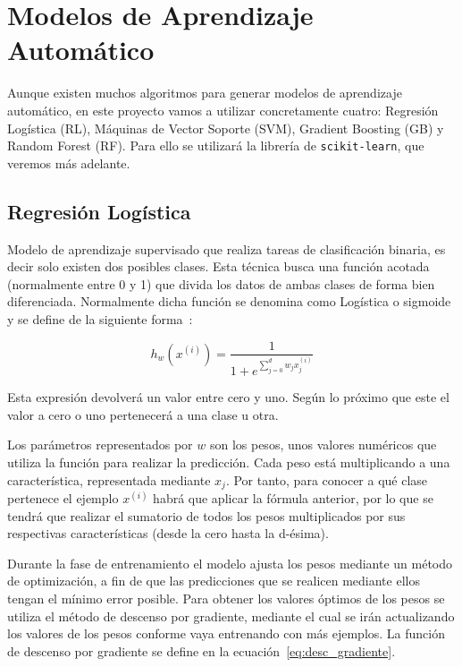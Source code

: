 \documentclass[a4paper, 12pt]{book}
\begin{document}
\section{Modelos de Aprendizaje Automático}
\label{sec:modelos_aautomatico}

Aunque existen muchos algoritmos para generar modelos de aprendizaje automático, en este proyecto vamos a utilizar concretamente cuatro: Regresión Logística (RL), Máquinas de Vector Soporte (SVM), Gradient Boosting (GB) y Random Forest (RF). Para ello se utilizará la librería de \texttt{scikit-learn}, que veremos más adelante.

\subsection{Regresión Logística}
\label{subsec:regresion_logistica}

Modelo de aprendizaje supervisado que realiza tareas de clasificación binaria, es decir solo existen dos posibles clases. Esta técnica busca una función acotada (normalmente entre 0 y 1) que divida los datos de ambas clases de forma bien diferenciada. Normalmente dicha función se denomina como Logística o sigmoide y se define de la siguiente forma~\cite{Watt2020}:

\begin{equation}
    h_w(x^{(i)}) = \frac{1}{1 + e^{\sum_{j=0}^{d} w_j x_j^{(i)} }}
\end{equation}

Esta expresión devolverá un valor entre cero y uno. Según lo próximo que este el valor a cero o uno pertenecerá a una clase u otra. 

Los parámetros representados por $w$ son los pesos, unos valores numéricos que utiliza la función para realizar la predicción. Cada peso está multiplicando a una característica, representada mediante $x_j$. Por tanto, para conocer a qué clase pertenece el ejemplo $x^{(i)}$ habrá que aplicar la fórmula anterior, por lo que se tendrá que realizar el sumatorio de todos los pesos multiplicados por sus respectivas características (desde la cero hasta la d-ésima). 

Durante la fase de entrenamiento el modelo ajusta los pesos mediante un método de optimización, a fin de que las predicciones que se realicen mediante ellos tengan el mínimo error posible. Para obtener los valores óptimos de los pesos se utiliza el método de descenso por gradiente, mediante el cual se irán actualizando los valores de los pesos conforme vaya entrenando con más ejemplos. La función de descenso por gradiente se define en la ecuación~\ref{eq:desc_gradiente}.
\end{document}
